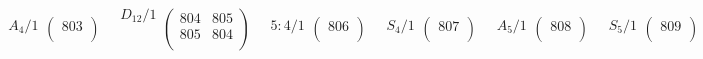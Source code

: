 \documentclass[11pt,a4paper]{amsart}
\begin{document}
\begin{align*}
\begin{array}{c}%
A_4/1 \\
\end{array}
\left(\begin{array}{r}%
803\\%
\end{array}\right)%
\quad
\begin{array}{c}%
D_{12}/1 \\
\phantom{D_{12}/1} \\
\end{array}
\left(\begin{array}{rr}%
804&805\\%
805&804\\%
\end{array}\right)%
\quad
\begin{array}{c}%
5{:}4/1 \\
\end{array}
\left(\begin{array}{r}%
806\\%
\end{array}\right)%
\quad
\begin{array}{c}%
S_4/1 \\
\end{array}
\left(\begin{array}{r}%
807\\%
\end{array}\right)%
\quad
\begin{array}{c}%
A_5/1 \\
\end{array}
\left(\begin{array}{r}%
808\\%
\end{array}\right)%
\quad
\begin{array}{c}%
S_5/1 \\
\end{array}
\left(\begin{array}{r}%
809\\%
\end{array}\right)%
\end{align*}
\end{document}
